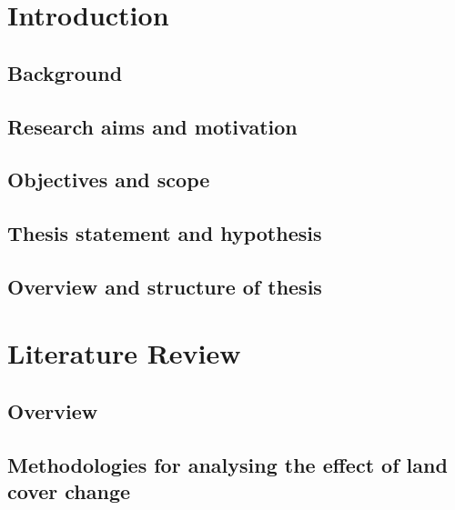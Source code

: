 \documentclass[12pt,a4paper,twoside]{book}
\begin{document}
\small
\frontmatter %
\dominitoc
{}
{\small  \tableofcontents}
\newpage
\thispagestyle{plain}
\normalsize
	\mainmatter %

	\chapter{Introduction}
	
\section{Background}

\section{Research aims and motivation}

\section{Objectives and scope}

\section{Thesis statement and hypothesis}

\section{Overview and structure of thesis}

	\chapter{Literature Review}
	
\section{Overview}

\section{Methodologies for analysing the effect of land cover change}
\end{document}
